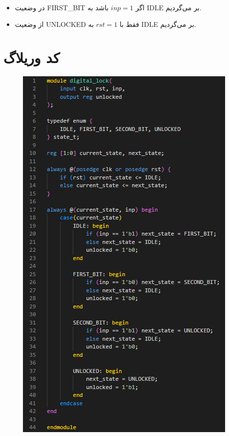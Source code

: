 \begin{itemize}
	\item در وضعیت FIRST\_BIT اگر $inp = 1$ باشد به IDLE بر می‌گردیم.
	\item از وضعیت UNLOCKED فقط با $rst = 1$ به IDLE بر می‌گردیم.
\end{itemize}

\newpage

\section*{کد وریلاگ}

\begin{figure}[h]
	\centering
	\includegraphics{3.jpg}
	\label{fig:label4}
\end{figure}

\newpage

